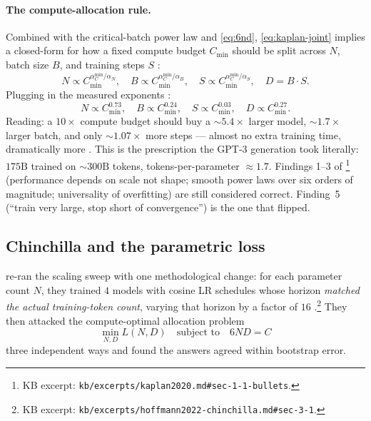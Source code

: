 \paragraph{The compute-allocation rule.}
Combined with the critical-batch power law and \cref{eq:6nd},
\cref{eq:kaplan-joint} implies a closed-form for how a fixed compute
budget $C_{\min}$ should be split across $N$, batch size $B$, and
training steps $S$ \citep[\S 1.2, eqs.\ 1.7--1.8]{kaplan2020}:
\begin{equation}
N \propto C_{\min}^{\alpha_C^{\min}/\alpha_N}, \quad
B \propto C_{\min}^{\alpha_C^{\min}/\alpha_B}, \quad
S \propto C_{\min}^{\alpha_C^{\min}/\alpha_S}, \quad
D = B \cdot S.
\label{eq:kaplan-alloc}
\tag{1.7}
\end{equation}
Plugging in the measured exponents \citep[\S 1.2]{kaplan2020}:
\begin{equation}
N \propto C_{\min}^{0.73}, \quad
B \propto C_{\min}^{0.24}, \quad
S \propto C_{\min}^{0.03}, \quad
D \propto C_{\min}^{0.27}.
\label{eq:kaplan-073}
\end{equation}
Reading: a $10\times$ compute budget should buy a $\sim 5.4\times$
larger model, $\sim 1.7\times$ larger batch, and only $\sim 1.07\times$
more steps --- almost no extra training time, dramatically more
. This is the prescription the GPT-3 generation took
literally: $175\text{B}$  trained on $\sim 300\text{B}$
tokens, tokens-per-parameter $\approx 1.7$. Findings 1--3 of
\citet[\S 1.1]{kaplan2020}\footnote{KB excerpt:
\texttt{kb/excerpts/kaplan2020.md\#sec-1-1-bullets}.} (performance
depends on scale not shape; smooth power laws over six orders of
magnitude; universality of overfitting) are still considered correct.
Finding~5 (``train very large, stop short of convergence'') is the one
that flipped.

\subsection{Chinchilla and the parametric loss}
\label{sec:scaling-chinchilla}

\citet{hoffmann2022-chinchilla} re-ran the scaling sweep with one
methodological change: for each parameter count $N$, they trained $4$
models with cosine LR schedules whose horizon \emph{matched the actual
training-token count}, varying that horizon by a factor of $16$
\citep[\S 3.1]{hoffmann2022-chinchilla}.\footnote{KB excerpt:
\texttt{kb/excerpts/hoffmann2022-chinchilla.md\#sec-3-1}.} They then
attacked the compute-optimal allocation problem
\begin{equation}
\min_{N, D} L(N, D) \quad \text{subject to} \quad 6 N D = C
\label{eq:cc-problem}
\end{equation}
three independent ways and found the answers agreed within bootstrap
error.

